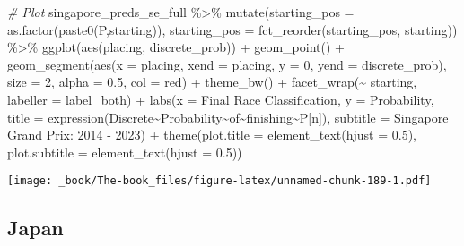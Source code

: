 \documentclass[
]{book}
\newenvironment{Shaded}{\begin{snugshade}}{\end{snugshade}}
\newcommand{\AttributeTok}[1]{\textcolor[rgb]{0.77,0.63,0.00}{#1}}
\newcommand{\CommentTok}[1]{\textcolor[rgb]{0.56,0.35,0.01}{\textit{#1}}}
\newcommand{\DecValTok}[1]{\textcolor[rgb]{0.00,0.00,0.81}{#1}}
\newcommand{\FloatTok}[1]{\textcolor[rgb]{0.00,0.00,0.81}{#1}}
\newcommand{\FunctionTok}[1]{\textcolor[rgb]{0.00,0.00,0.00}{#1}}
\newcommand{\NormalTok}[1]{#1}
\newcommand{\SpecialCharTok}[1]{\textcolor[rgb]{0.00,0.00,0.00}{#1}}
\newcommand{\StringTok}[1]{\textcolor[rgb]{0.31,0.60,0.02}{#1}}
\begin{document}
\begin{Shaded}
\begin{Highlighting}[]
\CommentTok{\# Plot}
\NormalTok{singapore\_preds\_se\_full }\SpecialCharTok{\%\textgreater{}\%}
  \FunctionTok{mutate}\NormalTok{(}\AttributeTok{starting\_pos =} \FunctionTok{as.factor}\NormalTok{(}\FunctionTok{paste0}\NormalTok{(}\StringTok{\textquotesingle{}P\textquotesingle{}}\NormalTok{,starting)),}
         \AttributeTok{starting\_pos =} \FunctionTok{fct\_reorder}\NormalTok{(starting\_pos, starting)) }\SpecialCharTok{\%\textgreater{}\%}
  \FunctionTok{ggplot}\NormalTok{(}\FunctionTok{aes}\NormalTok{(placing, discrete\_prob)) }\SpecialCharTok{+}
  \FunctionTok{geom\_point}\NormalTok{() }\SpecialCharTok{+}
  \FunctionTok{geom\_segment}\NormalTok{(}\FunctionTok{aes}\NormalTok{(}\AttributeTok{x =}\NormalTok{ placing, }\AttributeTok{xend =}\NormalTok{ placing, }\AttributeTok{y =} \DecValTok{0}\NormalTok{, }\AttributeTok{yend =}\NormalTok{ discrete\_prob),}
               \AttributeTok{size =} \DecValTok{2}\NormalTok{, }\AttributeTok{alpha =} \FloatTok{0.5}\NormalTok{, }\AttributeTok{col =} \StringTok{\textquotesingle{}red\textquotesingle{}}\NormalTok{) }\SpecialCharTok{+}
  \FunctionTok{theme\_bw}\NormalTok{() }\SpecialCharTok{+}
  \FunctionTok{facet\_wrap}\NormalTok{(}\SpecialCharTok{\textasciitilde{}}\NormalTok{ starting, }\AttributeTok{labeller =}\NormalTok{ label\_both) }\SpecialCharTok{+}
  \FunctionTok{labs}\NormalTok{(}\AttributeTok{x =} \StringTok{\textquotesingle{}Final Race Classification\textquotesingle{}}\NormalTok{,}
       \AttributeTok{y =} \StringTok{\textquotesingle{}Probability\textquotesingle{}}\NormalTok{,}
       \AttributeTok{title =} \FunctionTok{expression}\NormalTok{(Discrete}\SpecialCharTok{\textasciitilde{}}\NormalTok{Probability}\SpecialCharTok{\textasciitilde{}}\NormalTok{of}\SpecialCharTok{\textasciitilde{}}\NormalTok{finishing}\SpecialCharTok{\textasciitilde{}}\NormalTok{P[n]),}
       \AttributeTok{subtitle =} \StringTok{\textquotesingle{}Singapore Grand Prix: 2014 {-} 2023\textquotesingle{}}\NormalTok{) }\SpecialCharTok{+}
  \FunctionTok{theme}\NormalTok{(}\AttributeTok{plot.title =} \FunctionTok{element\_text}\NormalTok{(}\AttributeTok{hjust =} \FloatTok{0.5}\NormalTok{),}
        \AttributeTok{plot.subtitle =} \FunctionTok{element\_text}\NormalTok{(}\AttributeTok{hjust =} \FloatTok{0.5}\NormalTok{)) }
\end{Highlighting}
\end{Shaded}

\texttt{[image: \_book/The-book\_files/figure-latex/unnamed-chunk-189-1.pdf]}

\hypertarget{japan}{%
\subsection{Japan}\label{japan}}
\end{document}
